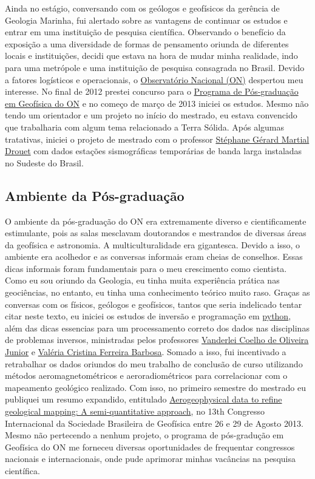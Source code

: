 \documentclass[10pt,a4paper,oneside]{book}
\begin{document}
Ainda no estágio, conversando com os geólogos e geofísicos da gerência de Geologia Marinha, fui alertado sobre as vantagens de continuar os estudos e entrar em uma instituição de pesquisa científica. Observando o benefício da exposição a uma diversidade de formas de pensamento oriunda de diferentes locais e instituições, decidi que estava na hora de mudar minha realidade, indo para uma metrópole e uma instituição de pesquisa consagrada no Brasil. Devido a fatores logísticos e operacionais, o \href{https://www.gov.br/observatorio/pt-br}{Observatório Nacional (ON)} despertou meu interesse. No final de 2012 prestei concurso para o \href{https://www.gov.br/observatorio/pt-br/assuntos/programas-academicos/pos-graduacao-em-geofisica}{Programa de Pós-graduação em Geofísica do ON} e no começo de março de 2013 iniciei os estudos. Mesmo não tendo um orientador e um projeto no início do mestrado, eu estava convencido que trabalharia com algum tema relacionado a Terra Sólida. Após algumas tratativas, iniciei o projeto de mestrado com o professor \href{http://lattes.cnpq.br/0563544084744404}{Stéphane Gérard Martial Drouet} com dados estações sismográficas temporárias de banda larga instaladas no Sudeste do Brasil.

\subsection{Ambiente da Pós-graduação}
\label{sec_posgrad_on}

O ambiente da pós-graduação do ON era extremamente diverso e cientificamente estimulante, pois as salas mesclavam doutorandos e mestrandos de diversas áreas da geofísica e astronomia. A multiculturalidade era gigantesca. Devido a isso, o ambiente era acolhedor e as conversas informais eram cheias de conselhos. Essas dicas informais foram fundamentais para o meu crescimento como cientista. Como eu sou oriundo da Geologia, eu tinha muita experiência prática nas geociências, no entanto, eu tinha uma conhecimento teórico muito raso. Graças as conversas com os físicos, geólogos e geofísicos, tantos que seria indelicado tentar citar neste texto, eu iniciei os estudos de inversão e programação em \href{https://www.python.org/}{python}, além das dicas essencias para um processamento correto dos dados nas disciplinas de problemas inversos, ministradas pelos professores \href{http://lattes.cnpq.br/4332841435949533}{Vanderlei Coelho de Oliveira Junior} e \href{http://lattes.cnpq.br/0391036221142471}{Valéria Cristina Ferreira Barbosa}. Somado a isso, fui incentivado a retrabalhar os dados oriundos do meu trabalho de conclusão de curso utilizando métodos aeromagnetométricos e aeroradiométricos para correlacionar com o mapeamento geológico realizado. Com isso, no primeiro semestre do mestrado eu publiquei um resumo expandido, entitulado \href{https://doi.org/10.1190/sbgf2013-129}{Aerogeophysical data to refine geological mapping: A semi-quantitative approach}, no 13th Congresso Internacional da Sociedade Brasileira de Geofísica entre 26 e 29 de Agosto 2013. Mesmo não pertecendo a nenhum projeto, o programa de pós-gradução em Geofísica do ON me forneceu diversas oportunidades de frequentar congressos nacionais e internacionais, onde pude aprimorar minhas vacâncias na pesquisa científica.
\end{document}
